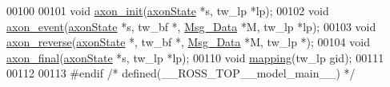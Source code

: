\begin{DoxyCode}
00100 
00101 \textcolor{keywordtype}{void} \hyperlink{model__main_8h_aa1b78ccf8fb2ff34c960d4c55576c714}{axon\_init}(\hyperlink{structaxon_state}{axonState} *s, tw\_lp *lp);
00102 \textcolor{keywordtype}{void} \hyperlink{model__main_8h_a3c053cd53c8082f6cfdd74666d2a484b}{axon\_event}(\hyperlink{structaxon_state}{axonState} *s, tw\_bf *, \hyperlink{struct_msg___data}{Msg\_Data} *M, tw\_lp *lp);
00103 \textcolor{keywordtype}{void} \hyperlink{model__main_8h_a5d4a72afee6ac1e8fd422d8f85a338b4}{axon\_reverse}(\hyperlink{structaxon_state}{axonState} *, tw\_bf *, \hyperlink{struct_msg___data}{Msg\_Data} *M, tw\_lp *);
00104 \textcolor{keywordtype}{void} \hyperlink{model__main_8h_a9f5c1071ccef11cdc8027264fca860c7}{axon\_final}(\hyperlink{structaxon_state}{axonState} *s, tw\_lp *lp);
00110 \textcolor{keywordtype}{void} \hyperlink{model__main_8h_a9397f1f0e189cd7dac262423993811e4}{mapping}(tw\_lp gid);
00111 
00112 
00113 \textcolor{preprocessor}{#endif }\textcolor{comment}{/* defined(\_\_ROSS\_TOP\_\_model\_main\_\_) */}\textcolor{preprocessor}{}
\end{DoxyCode}
